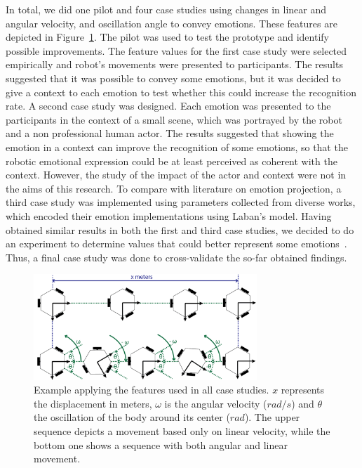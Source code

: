 In total, we did one pilot and four case studies using changes in linear and angular velocity, and oscillation angle to convey emotions. These features are depicted in Figure~\ref{fig:features}. The pilot was used to test the prototype and identify possible improvements. The feature values for the first case study were selected empirically and robot's movements were presented to participants. The results suggested that it was possible to convey some emotions, but it was decided to give a context to each emotion to test whether this could increase the recognition rate. A second case study was designed. Each emotion was presented to the participants in the context of a small scene, which was portrayed by the robot and a non professional human actor. The results suggested that showing the emotion in a context can improve the recognition of some emotions, so that the robotic emotional expression could be at least perceived as coherent with the context. However, the study of the impact of the actor and context were not in the aims of this research. To compare with literature on emotion projection, a third case study was implemented using parameters collected from diverse works, which encoded their emotion implementations using Laban's model. Having obtained similar results in both the first and third case studies, we decided to do an experiment to determine values that could better represent some emotions~\cite{Angel2017}. Thus, a final case study was done to cross-validate the so-far obtained findings.

\begin{figure}[h]
	\centering
	\includegraphics[width=0.75\textwidth]{./Images/ExampleMovement.png}
	\caption{Example applying the features used in all case studies. $x$ represents the displacement in meters, $\omega$ is the angular velocity ($rad/s$) and $\theta$ the oscillation of the body around its center ($rad$). The upper sequence depicts a movement based only on linear velocity, while the bottom one shows a sequence with both angular and linear movement.}
	\label{fig:features}
\end{figure} 


